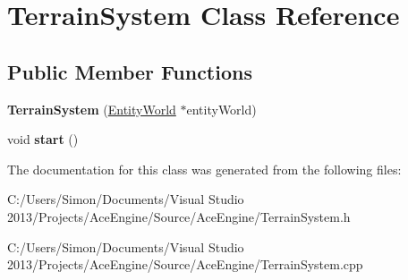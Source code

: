 \hypertarget{class_terrain_system}{}\section{Terrain\+System Class Reference}
\label{class_terrain_system}
\subsection*{Public Member Functions}
\begin{DoxyCompactItemize}
\item 
\hypertarget{class_terrain_system_a8e1cde2ee844c9f7ab890d65f07d5798}{}{\bfseries Terrain\+System} (\hyperlink{class_entity_world}{Entity\+World} $\ast$entity\+World)\label{class_terrain_system_a8e1cde2ee844c9f7ab890d65f07d5798}

\item 
\hypertarget{class_terrain_system_a27419922782976d8edcc759272344c21}{}void {\bfseries start} ()\label{class_terrain_system_a27419922782976d8edcc759272344c21}

\end{DoxyCompactItemize}


The documentation for this class was generated from the following files\+:\begin{DoxyCompactItemize}
\item 
C\+:/\+Users/\+Simon/\+Documents/\+Visual Studio 2013/\+Projects/\+Ace\+Engine/\+Source/\+Ace\+Engine/Terrain\+System.\+h\item 
C\+:/\+Users/\+Simon/\+Documents/\+Visual Studio 2013/\+Projects/\+Ace\+Engine/\+Source/\+Ace\+Engine/Terrain\+System.\+cpp\end{DoxyCompactItemize}
